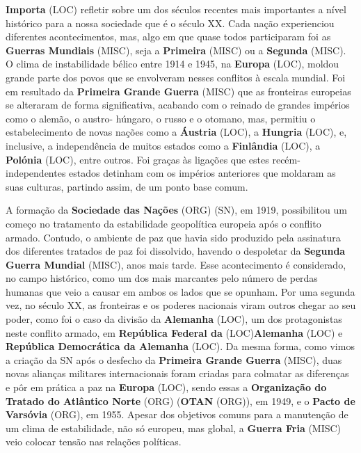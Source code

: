 \documentclass[12pt,a4paper]{article}
\begin{document}
\textbf{Importa} (LOC) refletir sobre um dos séculos recentes mais importantes a nível histórico para  a  nossa  sociedade  que  é  o  século  XX.  Cada  nação  experienciou  diferentes acontecimentos, mas, algo em que quase todos participaram foi as \textbf{Guerras Mundiais} (MISC), seja a \textbf{Primeira} (MISC) ou a \textbf{Segunda} (MISC). O clima de instabilidade bélico entre 1914 e 1945, na \textbf{Europa} (LOC), moldou grande parte dos povos que se envolveram nesses conflitos à escala mundial. Foi em resultado da \textbf{Primeira Grande Guerra} (MISC) que as fronteiras europeias se alteraram de forma significativa,  acabando  com  o  reinado  de  grandes  impérios  como  o  alemão,  o  austro- húngaro, o russo e o otomano, mas, permitiu o estabelecimento de novas nações como a \textbf{Áustria} (LOC), a \textbf{Hungria} (LOC), e, inclusive, a independência de muitos estados como a \textbf{Finlândia} (LOC), a \textbf{Polónia} (LOC),  entre  outros.  Foi  graças  às  ligações  que  estes  recém-independentes  estados detinham com os impérios anteriores que moldaram as suas culturas, partindo assim, de um ponto base comum.

A formação da \textbf{Sociedade das Nações} (ORG) (SN), em 1919, possibilitou um começo no tratamento  da  estabilidade  geopolítica  europeia  após  o  conflito  armado.  Contudo,  o ambiente de paz que havia sido produzido pela assinatura dos diferentes tratados de paz foi dissolvido, havendo o despoletar da \textbf{Segunda Guerra Mundial} (MISC), anos mais tarde. Esse acontecimento  é  considerado,  no  campo  histórico,  como  um  dos  mais  marcantes  pelo número de perdas humanas que veio a causar em ambos os lados que se opunham. Por uma segunda vez, no século XX, as fronteiras e os poderes nacionais viram outros chegar ao  seu  poder,  como  foi  o  caso  da  divisão  da  \textbf{Alemanha} (LOC),  um  dos  protagonistas  neste conflito  armado,  em  \textbf{República  Federal  da} (LOC)\textbf{Alemanha} (LOC)  e  \textbf{República  Democrática  da Alemanha} (LOC). Da mesma forma, como vimos a criação da SN após o desfecho da \textbf{Primeira Grande Guerra} (MISC), duas novas alianças militares internacionais foram criadas para colmatar as diferenças e pôr em prática a paz na \textbf{Europa} (LOC), sendo essas a \textbf{Organização do Tratado do Atlântico Norte} (ORG) (\textbf{OTAN} (ORG)), em 1949, e o \textbf{Pacto de Varsóvia} (ORG), em 1955. Apesar dos objetivos comuns para a manutenção de um clima de estabilidade, não só europeu, mas global, a \textbf{Guerra Fria} (MISC) veio colocar tensão nas relações políticas.
\end{document}
